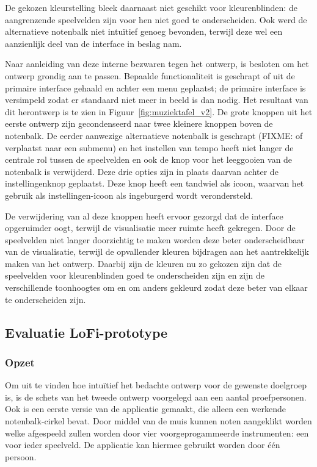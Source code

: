\documentclass{acm}
\begin{document}
De gekozen kleurstelling bleek daarnaast niet geschikt voor kleurenblinden: de aangrenzende speelvelden zijn voor hen niet goed te onderscheiden. Ook werd de alternatieve notenbalk niet intuïtief genoeg bevonden, terwijl deze wel een aanzienlijk deel van de interface in beslag nam.

Naar aanleiding van deze interne bezwaren tegen het ontwerp, is besloten om het ontwerp grondig aan te passen. Bepaalde functionaliteit is geschrapt of uit de primaire interface gehaald en achter een menu geplaatst; de primaire interface is versimpeld zodat er standaard niet meer in beeld is dan nodig. Het resultaat van dit herontwerp is te zien in Figuur~\ref{fig:muziektafel_v2}. De grote knoppen uit het eerste ontwerp zijn gecondenseerd naar twee kleinere knoppen boven de notenbalk. De eerder aanwezige alternatieve notenbalk is geschrapt (FIXME: of verplaatst naar een submenu) en het instellen van tempo heeft niet langer de centrale rol tussen de speelvelden en ook de knop voor het leeggooien van de notenbalk is verwijderd. Deze drie opties zijn in plaats daarvan achter de instellingenknop geplaatst. Deze knop heeft een tandwiel als icoon, waarvan het gebruik als instellingen-icoon als ingeburgerd wordt verondersteld.

De verwijdering van al deze knoppen heeft ervoor gezorgd dat de interface opgeruimder oogt, terwijl de visualisatie meer ruimte heeft gekregen. Door de speelvelden niet langer doorzichtig te maken worden deze beter onderscheidbaar van de visualisatie, terwijl de opvallender kleuren bijdragen aan het aantrekkelijk maken van het ontwerp. Daarbij zijn de kleuren nu zo gekozen zijn dat de speelvelden voor kleurenblinden goed te onderscheiden zijn en zijn de verschillende toonhoogtes om en om anders gekleurd zodat deze beter van elkaar te onderscheiden zijn.

\subsection{Evaluatie LoFi-prototype}
\subsubsection{Opzet}
Om uit te vinden hoe intuïtief het bedachte ontwerp voor de gewenste doelgroep is, is de schets van het tweede ontwerp voorgelegd aan een aantal proefpersonen. Ook is een eerste versie van de applicatie gemaakt, die alleen een werkende notenbalk-cirkel bevat. Door middel van de muis kunnen noten aangeklikt worden welke afgespeeld zullen worden door vier voorgeprogammeerde instrumenten: een voor ieder speelveld. De applicatie kan hiermee gebruikt worden door één persoon.
\end{document}
